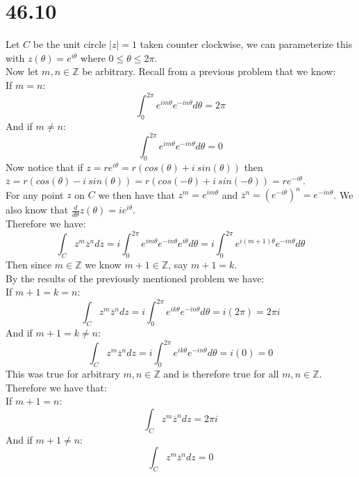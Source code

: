 \documentclass{article}
\begin{document}
\newpage
\section*{46.10}
\begin{center}
    \doublespacing
    Let $C$ be the unit circle $|z| = 1$ taken counter clockwise, we can parameterize this with $z(\theta) = e^{i\theta}$ where $0\leq\theta\leq 2\pi$.
    \\Now let $m, n\in\mathbb{Z}$ be arbitrary. Recall from a previous problem that we know:
    \\If $m = n$:
    \[\int _0^{2\pi} e^{im\theta} e^{-in\theta} d\theta = 2\pi\]
    And if $m\neq n$:
    \[\int _0^{2\pi} e^{im\theta} e^{-in\theta} d\theta = 0\]
    Now notice that if $z = re^{i\theta} = r(cos(\theta) + i\:sin(\theta))$ then $\overline{z} = r(cos(\theta) - i\:sin(\theta)) = r(cos(-\theta) + i\:sin(-\theta)) = re^{-i\theta}$.
    \\For any point $z$ on $C$ we then have that $z^m = e^{im\theta}$ and $\overline{z}^n = (e^{-i\theta})^n = e^{-in\theta}$. We also know that $\frac{d}{d\theta} z(\theta) = ie^{i\theta}$.
    \\Therefore we have:
    \[\int _C z^m\overline{z}^n dz = i\int _0^{2\pi} e^{im\theta}e^{-in\theta}e^{i\theta} d\theta = i\int _0^{2\pi} e^{i(m+1)\theta}e^{-in\theta} d\theta\]
    Then since $m\in\mathbb{Z}$ we know $m + 1\in\mathbb{Z}$, say $m + 1 = k$.
    \\By the results of the previously mentioned problem we have:
    \\If $m + 1 = k = n$:
    \[\int _C z^m\overline{z}^n dz = i\int _0^{2\pi} e^{ik\theta}e^{-in\theta} d\theta = i(2\pi) = 2\pi i\]
    And if $m + 1 = k\neq n$:
    \[\int _C z^m\overline{z}^n dz = i\int _0^{2\pi} e^{ik\theta}e^{-in\theta} d\theta = i(0) = 0\]
    This was true for arbitrary $m, n\in\mathbb{Z}$ and is therefore true for all $m, n\in\mathbb{Z}$.
    Therefore we have that:
    \\If $m + 1 = n$:
    \[\int _C z^m\overline{z}^n dz = 2\pi i\]
    And if $m + 1\neq n$:
    \[\int _C z^m\overline{z}^n dz = 0\]
    \qedsymbol
\end{center}


\newpage
\end{document}
